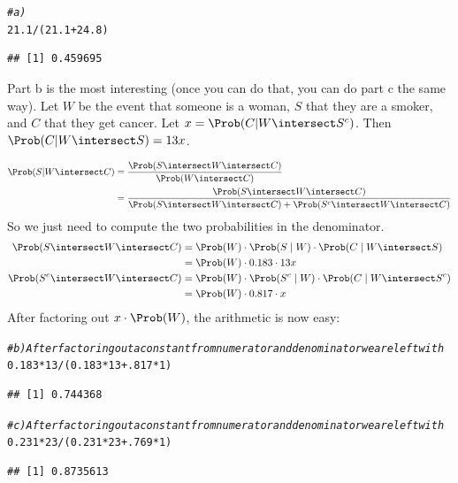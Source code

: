 \documentclass[twoside]{book}\usepackage[]{graphicx}\usepackage[]{xcolor}
\makeatletter
\newcommand{\hlnum}[1]{\textcolor[rgb]{0.686,0.059,0.569}{#1}}%
\newcommand{\hlcom}[1]{\textcolor[rgb]{0.678,0.584,0.686}{\textit{#1}}}%
\newcommand{\hlopt}[1]{\textcolor[rgb]{0,0,0}{#1}}%
\newcommand{\hlstd}[1]{\textcolor[rgb]{0.345,0.345,0.345}{#1}}%
\newenvironment{kframe}{%
 \def\at@end@of@kframe{}%
 \ifinner\ifhmode%
  \def\at@end@of@kframe{\end{minipage}}%
  \begin{minipage}{\columnwidth}%
 \fi\fi%
 \def\FrameCommand##1{\hskip\@totalleftmargin \hskip-\fboxsep
 \colorbox{shadecolor}{##1}\hskip-\fboxsep
     \hskip-\linewidth \hskip-\@totalleftmargin \hskip\columnwidth}%
 \MakeFramed {\advance\hsize-\width
   \@totalleftmargin\z@ \linewidth\hsize
   \@setminipage}}%
 {\par\unskip\endMakeFramed%
 \at@end@of@kframe}
\newenvironment{knitrout}{}{} %
\makeatother
\begin{document}
\begin{solution}
\begin{knitrout}
\color{fgcolor}\begin{kframe}
\begin{alltt}
\hlcom{# a)}
\hlnum{21.1} \hlopt{/} \hlstd{(} \hlnum{21.1} \hlopt{+} \hlnum{24.8}\hlstd{)}
\end{alltt}
\begin{verbatim}
## [1] 0.459695
\end{verbatim}
\end{kframe}
\end{knitrout}
Part b is the most interesting (once you can do that, you can do part c the same way).
Let $W$ be the event that someone is a woman, $S$ that they are a smoker, and $C$ that they
get cancer. Let $x = \Prob( C | W \intersect S^c)$.  Then $\Prob( C | W \intersect S ) = 13x$.

\begin{align*}
	\Prob( S | W \intersect C ) 
	& = \frac{ \Prob(S \intersect W \intersect C) }{\Prob(W \intersect C)}
	\\
	& = \frac{ \Prob(S \intersect W \intersect C) }
	{\Prob(S \intersect W \intersect C) + \Prob( S^c \intersect W \intersect C)}
\end{align*}
So we just need to compute the two probabilities in the denominator.
\begin{align*}
	\Prob(S \intersect W \intersect C)
	&= \Prob(W) \cdot \Prob(S \mid W) \cdot \Prob(C \mid W \intersect S) 
	\\
	&= \Prob(W) \cdot 0.183 \cdot 13x
	\\
	\Prob(S^c \intersect W \intersect C)
	&= \Prob(W) \cdot \Prob(S^c \mid W) \cdot \Prob(C \mid W \intersect S^c) 
	\\
	&= \Prob(W) \cdot 0.817 \cdot x
\end{align*}
After factoring out $x \cdot \Prob(W)$, the arithmetic is now easy:

\begin{knitrout}
\color{fgcolor}\begin{kframe}
\begin{alltt}
\hlcom{# b) After factoring out a constant from numerator and denominator we are left with}
\hlnum{0.183} \hlopt{*} \hlnum{13} \hlopt{/} \hlstd{(} \hlnum{0.183} \hlopt{*} \hlnum{13} \hlopt{+} \hlnum{.817} \hlopt{*} \hlnum{1} \hlstd{)}
\end{alltt}
\begin{verbatim}
## [1] 0.744368
\end{verbatim}
\begin{alltt}
\hlcom{# c) After factoring out a constant from numerator and denominator we are left with}
\hlnum{0.231} \hlopt{*} \hlnum{23} \hlopt{/} \hlstd{(} \hlnum{0.231} \hlopt{*} \hlnum{23} \hlopt{+} \hlnum{.769} \hlopt{*} \hlnum{1} \hlstd{)}
\end{alltt}
\begin{verbatim}
## [1] 0.8735613
\end{verbatim}
\end{kframe}
\end{knitrout}


\end{solution}
\end{document}
